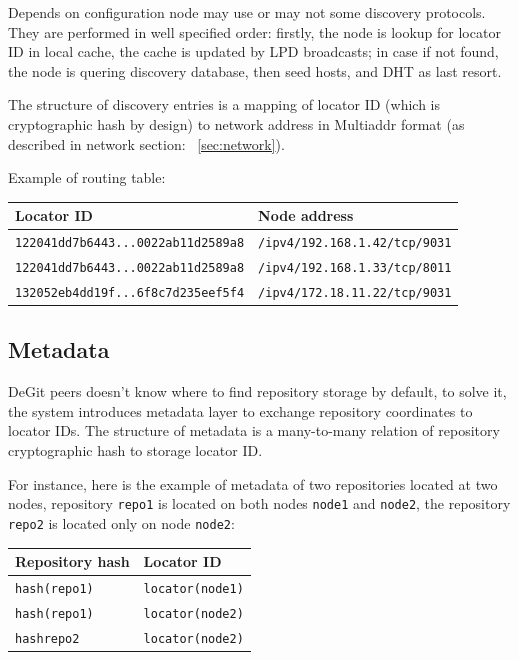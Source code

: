 \documentclass[12pt,oneside]{article}
\newcommand{\code}[1]{\texttt{#1}}
\begin{document}
Depends on configuration node may use or may not some discovery protocols. They are performed
in well specified order: firstly, the node is lookup for locator ID in local cache, the cache is updated
by LPD broadcasts; in case if not found, the node is quering discovery database, then seed hosts, and DHT
as last resort.

The structure of discovery entries is a mapping of locator ID (which is cryptographic hash by design)
to network address in Multiaddr format (as described in network section: ~\ref{sec:network}).

Example of routing table:

\begin{tabular}{l | l}
  Locator ID & Node address \\ \hline
  \code{122041dd7b6443...0022ab11d2589a8} & \code{/ipv4/192.168.1.42/tcp/9031} \\
  \code{122041dd7b6443...0022ab11d2589a8} & \code{/ipv4/192.168.1.33/tcp/8011} \\
  \code{132052eb4dd19f...6f8c7d235eef5f4} & \code{/ipv4/172.18.11.22/tcp/9031} \\
\end{tabular}

\subsection{Metadata}
\label{sec:metadata}

DeGit peers doesn't know where to find repository storage by default,
to solve it, the system introduces metadata layer to exchange repository coordinates
to locator IDs. The structure of metadata is a many-to-many relation of
repository cryptographic hash to storage locator ID.

For instance, here is the example of metadata of two repositories located at two nodes,
repository \code{repo1} is located on both nodes \code{node1} and \code{node2},
the repository \code{repo2} is located only on node \code{node2}:

\begin{tabular}{l | l}
  Repository hash & Locator ID \\ \hline
  \code{hash(repo1)} & \code{locator(node1)} \\
  \code{hash(repo1)} & \code{locator(node2)} \\
  \code{hash{repo2}} & \code{locator(node2)} \\
\end{tabular}
\end{document}
